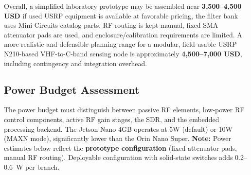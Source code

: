 \documentclass[11pt,a4paper]{article}
\newcommand{\blue}[1]{\textcolor{priceblue}{\textbf{#1}}}
\begin{document}
	Overall, a simplified laboratory prototype may be assembled near
	\blue{3,500--4,500 USD} if used USRP equipment is available at favorable
	pricing, the filter bank uses Mini-Circuits catalog parts, RF routing is kept
	manual, fixed SMA attenuator pads are used, and enclosure/calibration
	requirements are limited. A more realistic and defensible planning range for a
	modular, field-usable USRP N210-based VHF-to-C-band sensing node is
	approximately \blue{4,500--7,000 USD}, including contingency and integration
	overhead.
	
	\subsection*{Power Budget Assessment}
	
	The power budget must distinguish between passive RF elements, low-power RF
	control components, active RF gain stages, the SDR, and the embedded processing
	backend. The Jetson Nano 4GB operates at 5W (default) or 10W (MAXN mode),
	significantly lower than the Orin Nano Super. \textbf{Note:} Power estimates
	below reflect the \textbf{prototype configuration} (fixed attenuator pads,
	manual RF routing). Deployable configuration with solid-state switches adds
	0.2--0.6~W per branch.
	
\end{document}
